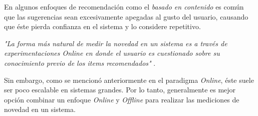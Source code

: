     En algunos enfoques de recomendación como el \textit{basado en contenido} es común que las sugerencias sean excesivamente apegadas al gusto del usuario, causando que éste pierda confianza en el sistema y lo considere repetitivo.

    \textit{"La forma más natural de medir la novedad en un sistema es a través de experimentaciones Online en donde el usuario es cuestionado sobre su conocimiento previo de los items recomendados"} \parencite{Aggarwal2016}.

    Sin embargo, como se mencionó anteriormente en el paradigma \textit{Online}, éste suele ser poco escalable en sistemas grandes. Por lo tanto, generalmente es mejor opción combinar un enfoque \textit{Online} y \textit{Offline} para realizar las mediciones de novedad en un sistema.
    








